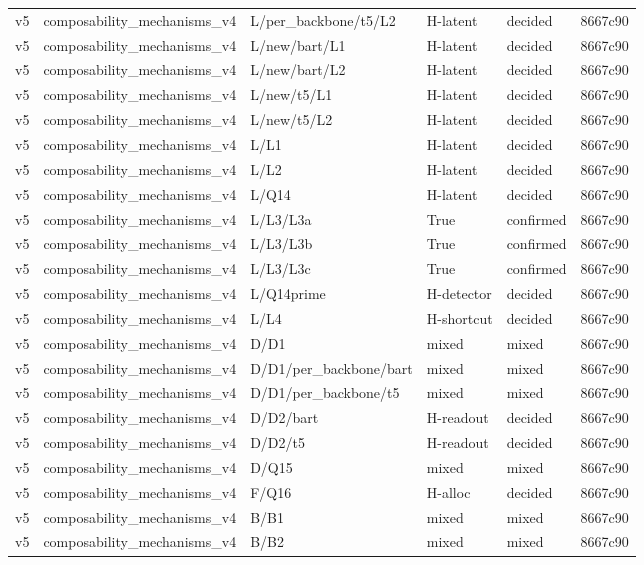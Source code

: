 \begin{longtable}{llllll}
v5 & composability\_mechanisms\_v4 & L/per\_backbone/t5/L2 & H-latent & decided & 8667c90 \\
v5 & composability\_mechanisms\_v4 & L/new/bart/L1 & H-latent & decided & 8667c90 \\
v5 & composability\_mechanisms\_v4 & L/new/bart/L2 & H-latent & decided & 8667c90 \\
v5 & composability\_mechanisms\_v4 & L/new/t5/L1 & H-latent & decided & 8667c90 \\
v5 & composability\_mechanisms\_v4 & L/new/t5/L2 & H-latent & decided & 8667c90 \\
v5 & composability\_mechanisms\_v4 & L/L1 & H-latent & decided & 8667c90 \\
v5 & composability\_mechanisms\_v4 & L/L2 & H-latent & decided & 8667c90 \\
v5 & composability\_mechanisms\_v4 & L/Q14 & H-latent & decided & 8667c90 \\
v5 & composability\_mechanisms\_v4 & L/L3/L3a & True & confirmed & 8667c90 \\
v5 & composability\_mechanisms\_v4 & L/L3/L3b & True & confirmed & 8667c90 \\
v5 & composability\_mechanisms\_v4 & L/L3/L3c & True & confirmed & 8667c90 \\
v5 & composability\_mechanisms\_v4 & L/Q14prime & H-detector & decided & 8667c90 \\
v5 & composability\_mechanisms\_v4 & L/L4 & H-shortcut & decided & 8667c90 \\
v5 & composability\_mechanisms\_v4 & D/D1 & mixed & mixed & 8667c90 \\
v5 & composability\_mechanisms\_v4 & D/D1/per\_backbone/bart & mixed & mixed & 8667c90 \\
v5 & composability\_mechanisms\_v4 & D/D1/per\_backbone/t5 & mixed & mixed & 8667c90 \\
v5 & composability\_mechanisms\_v4 & D/D2/bart & H-readout & decided & 8667c90 \\
v5 & composability\_mechanisms\_v4 & D/D2/t5 & H-readout & decided & 8667c90 \\
v5 & composability\_mechanisms\_v4 & D/Q15 & mixed & mixed & 8667c90 \\
v5 & composability\_mechanisms\_v4 & F/Q16 & H-alloc & decided & 8667c90 \\
v5 & composability\_mechanisms\_v4 & B/B1 & mixed & mixed & 8667c90 \\
v5 & composability\_mechanisms\_v4 & B/B2 & mixed & mixed & 8667c90 \\

\end{longtable}
